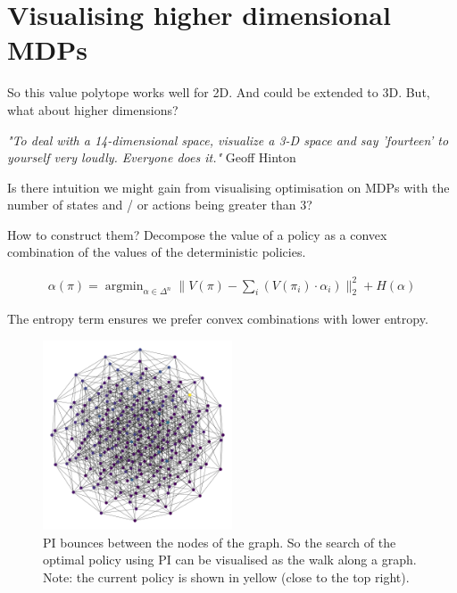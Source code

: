 
\newpage
\section{Visualising higher dimensional MDPs}\label{graph-vis}

So this value polytope works well for 2D. And could be extended to 3D. But, what about higher dimensions?

\begin{displayquote}
  \textit{"To deal with a 14-dimensional space, visualize a 3-D space and say 'fourteen' to yourself very loudly. Everyone does it."} Geoff Hinton
\end{displayquote}

Is there intuition we might gain from visualising optimisation on MDPs with the
number of states and / or actions being greater than 3?

How to construct them? Decompose the value of a policy as a convex combination
of the values of the deterministic policies.

\begin{align*}
  \alpha(\pi) = \mathop{\text{argmin}}_{\alpha \in \Delta^n} \parallel  V(\pi) - \sum_i (V(\pi_i) \cdot \alpha_i ) \parallel_2^2 + H(\alpha)
\end{align*}

The entropy term ensures we prefer convex combinations with lower entropy.
\newpage

\begin{figure}[!h]
\centering
\includegraphics[width=0.5\textwidth,height=0.3\textheight]{../../pictures/figures/discrete-graph.png}
\caption{PI bounces between the nodes of the graph.
So the search of the optimal policy using PI can be visualised as the walk along a graph.
Note: the current policy is shown in yellow (close to the top right).}
\end{figure}

